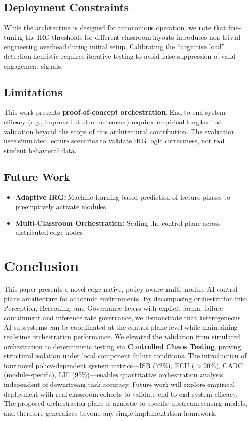 \documentclass[conference]{IEEEtran}
\begin{document}
\subsection{Deployment Constraints}
While the architecture is designed for autonomous operation, we note that fine-tuning the IRG thresholds for different classroom layouts introduces non-trivial engineering overhead during initial setup. Calibrating the ``cognitive load'' detection heuristic requires iterative testing to avoid false suppression of valid engagement signals.

\subsection{Limitations}
This work presents \textbf{proof-of-concept orchestration}. End-to-end system efficacy (e.g., improved student outcomes) requires empirical longitudinal validation beyond the scope of this architectural contribution. The evaluation uses simulated lecture scenarios to validate IRG logic correctness, not real student behavioral data.

\subsection{Future Work}
\begin{itemize}
    \item \textbf{Adaptive IRG:} Machine learning-based prediction of lecture phases to preemptively activate modules
    \item \textbf{Multi-Classroom Orchestration:} Scaling the control plane across distributed edge nodes
\end{itemize}

\section{Conclusion}

This paper presents a novel edge-native, policy-aware multi-module AI control plane architecture for academic environments. By decomposing orchestration into Perception, Reasoning, and Governance layers with explicit formal failure containment and inference rate governance, we demonstrate that heterogeneous AI subsystems can be coordinated at the control-plane level while maintaining real-time orchestration performance. We elevated the validation from simulated orchestration to deterministic testing via \textbf{Controlled Chaos Testing}, proving structural isolation under local component failure conditions. The introduction of four novel policy-dependent system metrics---ISR (72\%), ECU ($>90\%$), CADC (module-specific), LIF (95\%)---enables quantitative orchestration analysis independent of downstream task accuracy. Future work will explore empirical deployment with real classroom cohorts to validate end-to-end system efficacy. The proposed orchestration plane is agnostic to specific upstream sensing models, and therefore generalizes beyond any single implementation framework.
\end{document}
